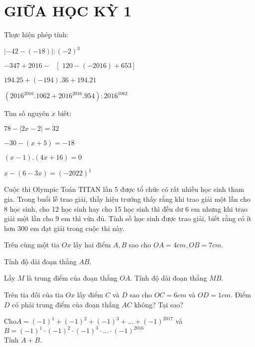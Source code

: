 \section{GIỮA HỌC KỲ 1}
\setcounter{ex}{0}
\begin{ex}
	Thực hiện phép tính:
	\begin{listEX}
	\item $\left| -42-(-18) \right|:{{(-2)}^{3}}$ 
\item $-347+2016-\text{ }\!\![\!\!\text{ 120}-(-2016)+653]$ 
\item $194.25+(-194).36+194.21$ 
\item $({{2016}^{2016}}.1062+{{2016}^{2016}}.954):{{2016}^{1062}}$ 
	\end{listEX}
\end{ex}
\begin{ex}
	Tìm số nguyên $x$ biết:
	\begin{listEX}[2]
	\item $78-\left| 2x-2 \right|=32$ 
\item $-30-(x+5)=-18$ 
\item $(x-1).(4x+16)=0$ 
\item $x-(6-3x)={{(-2022)}^{1}}$ 
	\end{listEX}
\end{ex}
\begin{ex}
	Cuộc thi Olympic Toán TITAN lần 5 được tổ chức có rất nhiều học sinh tham gia. Trong buổi lễ trao giải, thầy hiệu trưởng thấy rằng khi trao giải một lần cho 8 học sinh, cho 12 học sinh hay cho 15 học sinh thì đều dư 6 em nhưng khi trao giải một lần cho 9 em thì vừa đủ. Tính số học sinh được trao giải, biết rằng có ít hơn 300 em đạt giải trong cuộc thi này. 
\end{ex}
\begin{ex}
	Trên cùng một tia $Ox$ lấy hai điểm $A, B$ sao cho $OA = 4cm, OB = 7cm$.
		\begin{listEX}
			\item Tính độ dài đoạn thẳng $AB$.
	\item Lấy $M$ là trung điểm của đoạn thẳng $OA$. Tính độ dài đoạn thẳng $MB$.
	\item Trên tia đối của tia $Ox$ lấy điểm $C$ và $D$ sao cho $OC = 6 cm$ và $OD = 1 cm$. Điểm $D$ có phải trung điểm của đoạn thẳng $AC$ không? Tại sao?
		\end{listEX}
\end{ex}
\begin{ex}
	Cho$A={{(-1)}^{1}}+{{(-1)}^{2}}+{{(-1)}^{3}}+...+{{(-1)}^{2017}}$ và\\ $B={{(-1)}^{1}}\cdot {{(-1)}^{2}}\cdot {{(-1)}^{3}}\cdot ...\cdot {{(-1)}^{2016}}$\\
	Tính $A + B$.
\end{ex}